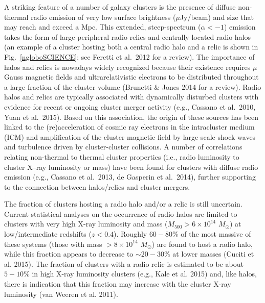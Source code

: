 \documentclass[11pt]{article}
\begin{document}
A striking feature of a number of galaxy clusters is the presence of diffuse non-thermal 
radio emission of very low surface brightness ($\mu$Jy/beam) and size that may reach and 
exceed a Mpc. This extended, steep-spectrum ($\alpha < -1$) emission takes the form of 
large peripheral radio relics and centrally located radio halos (an example of a cluster 
hosting both a central radio halo and a relic is shown in Fig.~\ref{ngloboSCIENCE}; see 
Feretti et al.\ 2012 for a review). The importance of halos and relics is nowadays widely 
recognized because their existence requires $\mu$Gauss magnetic fields and ultrarelativistic 
electrons to be distributed throughout a large fraction of the cluster volume (Brunetti \& 
Jones 2014 for a review).  Radio halos and relics are typically associated with dynamically 
disturbed clusters with evidence for recent or ongoing cluster merger activity (e.g., Cassano et al.\ 2010, 
Yuan et al.\ 2015). Based on this association, the origin of these sources has been linked 
to the (re)acceleration of cosmic ray electrons in the intracluster medium (ICM) and 
amplification of the cluster magnetic field by large-scale shock waves and turbulence 
driven by cluster-cluster collisions. A number of correlations relating non-thermal to 
thermal cluster properties (i.e., radio luminosity to cluster X--ray luminosity or mass) 
have been found for clusters with diffuse radio emission (e.g., Cassano et al.\ 2013, de 
Gasperin et al.\ 2014), further supporting to the connection between halos/relics and 
cluster mergers.

The fraction of clusters hosting a radio halo and/or a relic is still uncertain. Current 
statistical analyses on the occurrence of radio halos are limited to clusters with 
very high X-ray luminosity and mass ($M_{500}>6 \times 10^{14}$ $M_{\odot}$) at low/intermediate 
redshifts ($z<0.4$). Roughly $60-80\%$ of the most massive of these systems (those with mass
$> 8\times 10^{14}$ $M_{\odot}$) are found to host a radio halo, while this fraction appears 
to decrease to $\sim 20-30\%$ at lower masses (Cuciti et al. 2015). The fraction of clusters 
with a radio relic is estimated to be about $5-10\%$ in high X-ray luminosity clusters 
(e.g., Kale et al. 2015) and, like halos, there is indication that this fraction may 
increase with the cluster X-ray luminosity (van Weeren et al. 2011).
\end{document}

